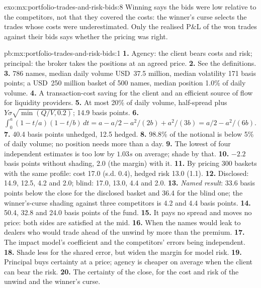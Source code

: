 \begin{solution}{exo:mx:portfolio-trades-and-risk-bids:8}
Winning says the bids were low relative to the competitors, not that they covered the costs: the winner's curse selects the trades whose costs were
underestimated. Only the realised P\&L of the won trades against their bids says whether the pricing was right.
\end{solution}

\begin{solution}{pb:mx:portfolio-trades-and-risk-bids:1}
\textbf{1.} Agency: the client bears costs and risk; principal: the broker takes the positions at an agreed price.
\textbf{2.} See the definitions.
\textbf{3.} 786 names, median daily volume USD~37.5 million, median volatility 171 basis points; a USD~250 million basket of 500 names, median
position 1.0\% of daily volume.
\textbf{4.} A transaction-cost saving for the client and an efficient source of flow for liquidity providers.
\textbf{5.} At most 20\% of daily volume, half-spread plus $Y\sigma\sqrt{\min(Q/V,0.2)}$; 14.9 basis points.
\textbf{6.} $\int_0^a(1-t/a)(1-t/b)\,dt=a-a/2-a^2/(2b)+a^2/(3b)=a/2-a^2/(6b)$.
\textbf{7.} 40.4 basis points unhedged, 12.5 hedged.
\textbf{8.} 98.8\% of the notional is below 5\% of daily volume; no position needs more than a day.
\textbf{9.} The lowest of four independent estimates is too low by $1.03s$ on average; shade by that.
\textbf{10.} $-2.2$ basis points without shading, 2.0 (the margin) with it.
\textbf{11.} By pricing 300 baskets with the same profile: cost 17.0 (s.d. 0.4), hedged risk 13.0 (1.1).
\textbf{12.} Disclosed: 14.9, 12.5, 4.2 and 2.0; blind: 17.0, 13.0, 4.4 and 2.0.
\textbf{13.} \emph{Named result}: 33.6 basis points below the close for the disclosed basket and 36.4 for the blind one; the winner's-curse shading
against three competitors is 4.2 and 4.4 basis points.
\textbf{14.} 50.4, 32.8 and 24.0 basis points of the fund.
\textbf{15.} It pays no spread and moves no price: both sides are satisfied at the mid.
\textbf{16.} When the names would leak to dealers who would trade ahead of the unwind by more than the premium.
\textbf{17.} The impact model's coefficient and the competitors' errors being independent.
\textbf{18.} Shade less for the shared error, but widen the margin for model risk.
\textbf{19.} Principal buys certainty at a price; agency is cheaper on average when the client can bear the risk.
\textbf{20.} The certainty of the close, for the cost and risk of the unwind and the winner's curse.
\end{solution}

